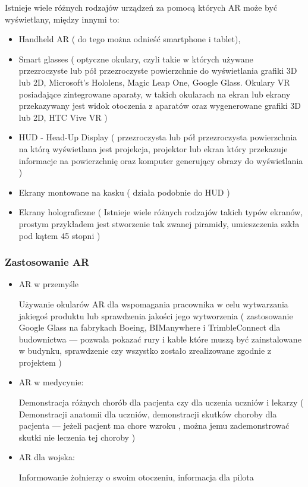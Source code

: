 Istnieje wiele różnych rodzajów urządzeń za pomocą których AR może być wyświetlany, między  innymi to:

\begin{itemize}
	\item Handheld AR ( do tego można odnieść smartphone i tablet), 
	\item Smart glasses ( optyczne okulary, czyli takie w których używane przezroczyste lub pół przezroczyste powierzchnie do wyświetlania grafiki 3D lub 2D, Microsoft’s Hololens, Magic  Leap One, Google Glass. Okulary VR posiadające zintegrowane aparaty, w takich okularach  na ekran lub ekrany przekazywany jest widok otoczenia z aparatów oraz wygenerowane  grafiki 3D lub 2D, HTC Vive VR ) 
	\item HUD - Head-Up Display ( przezroczysta lub pół przezroczysta powierzchnia na którą wyświetlana jest projekcja, projektor lub ekran który przekazuje informacje na powierzchnię  oraz komputer generujący obrazy do wyświetlania ) 
	\item Ekrany montowane na kasku ( działa podobnie do HUD ) 
	\item Ekrany holograficzne ( Istnieje wiele różnych rodzajów takich typów ekranów, prostym  przykładem jest stworzenie tak zwanej piramidy, umieszczenia szkła pod kątem 45 stopni )
\end{itemize}

\subsubsection{Zastosowanie AR}

\begin{itemize}
	\item AR w przemyśle
	
	Używanie okularów AR dla wspomagania pracownika w celu wytwarzania  jakiegoś produktu lub sprawdzenia jakości jego wytworzenia ( zastosowanie Google Glass na  fabrykach Boeing, BIManywhere i TrimbleConnect dla budownictwa — pozwala pokazać rury i  kable które muszą być zainstalowane w budynku, sprawdzenie czy wszystko zostało zrealizowane  zgodnie z projektem ) 
	
	\item AR w medycynie: 
	
	Demonstracja różnych chorób dla pacjenta czy dla uczenia uczniów i lekarzy ( Demonstracji  anatomii dla uczniów, demonstracji skutków choroby dla pacjenta — jeżeli pacjent ma chore  wzroku , można jemu zademonstrować skutki nie leczenia tej choroby ) 
	
	\item AR dla wojska: 
	
	Informowanie żołnierzy o swoim otoczeniu, informacja dla pilota
\end{itemize}

